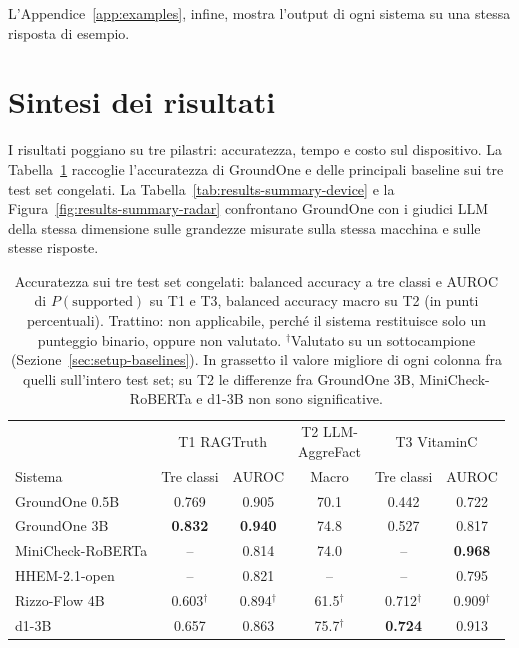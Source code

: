 L'Appendice~\ref{app:examples}, infine, mostra l'output di ogni sistema su una stessa risposta di esempio.

\section{Sintesi dei risultati}
\label{sec:results-summary}

I risultati poggiano su tre pilastri: accuratezza, tempo e costo sul dispositivo. La
Tabella~\ref{tab:results-summary-accuracy} raccoglie l'accuratezza di GroundOne e delle principali baseline sui tre test
set congelati. La Tabella~\ref{tab:results-summary-device} e la Figura~\ref{fig:results-summary-radar} confrontano
GroundOne con i giudici LLM della stessa dimensione sulle grandezze misurate sulla stessa macchina e sulle stesse
risposte.

\begin{table}[htbp]
\centering
\caption{Accuratezza sui tre test set congelati: balanced accuracy a tre classi e AUROC di $P(\text{supported})$ su T1 e
T3, balanced accuracy macro su T2 (in punti percentuali). Trattino: non applicabile, perché il sistema restituisce solo un
punteggio binario, oppure non valutato. $^{\dagger}$Valutato su un sottocampione (Sezione~\ref{sec:setup-baselines}). In grassetto il valore migliore di ogni colonna fra quelli sull'intero test set; su T2 le differenze fra GroundOne 3B, MiniCheck-RoBERTa e d1-3B non sono significative.}
\label{tab:results-summary-accuracy}
\small
\setlength{\tabcolsep}{4pt}
\begin{tabular}{lccccc}
\toprule
 & \multicolumn{2}{c}{T1 RAGTruth} & \makecell{T2 LLM-\\AggreFact} & \multicolumn{2}{c}{T3 VitaminC} \\
\cmidrule(lr){2-3}\cmidrule(lr){4-4}\cmidrule(l){5-6}
Sistema & Tre classi & AUROC & Macro & Tre classi & AUROC \\
\midrule
GroundOne 0.5B & 0.769 & 0.905 & 70.1 & 0.442 & 0.722 \\
GroundOne 3B & \textbf{0.832} & \textbf{0.940} & 74.8 & 0.527 & 0.817 \\
MiniCheck-RoBERTa & -- & 0.814 & 74.0 & -- & \textbf{0.968} \\
HHEM-2.1-open & -- & 0.821 & -- & -- & 0.795 \\
Rizzo-Flow 4B & 0.603$^{\dagger}$ & 0.894$^{\dagger}$ & 61.5$^{\dagger}$ & 0.712$^{\dagger}$ & 0.909$^{\dagger}$ \\
d1-3B & 0.657 & 0.863 & 75.7$^{\dagger}$ & \textbf{0.724} & 0.913 \\
\bottomrule
\end{tabular}
\end{table}

